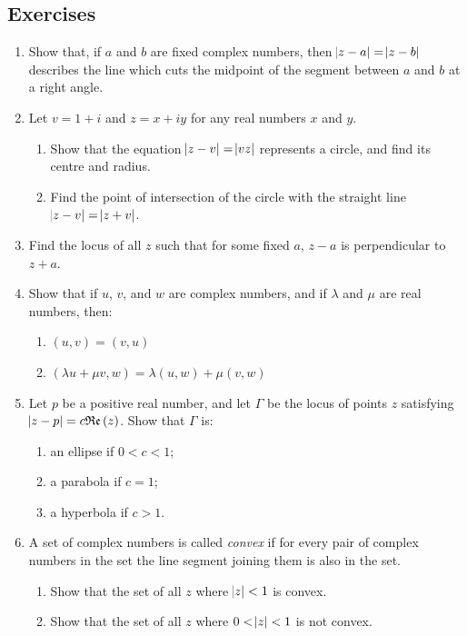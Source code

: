 \documentclass[a4paper,10pt,titlepage]{article}
\theoremstyle{definition}
\newcommand*\realp[1]{ \mathfrak{Re} \left ( {#1} \right )  }
\newcommand{\hard}{\refstepcounter{enumi}\item[$^\star$\theenumi.]}
\begin{document}
\subsection*{Exercises}
\begin{enumerate}
  \item Show that, if $ a $ and $ b $ are fixed complex numbers, then $ \abs{z - a} = \abs{z - b} $ describes the line which
        cuts the midpoint of the segment between $ a $ and $ b $ at a right angle.
  \hard Let $ v = 1 + i $ and $ z = x + iy $ for any real numbers $ x $ and $ y $.
    \begin{enumerate}
      \item Show that the equation $ \abs{z - v} = \abs{vz} $ represents a circle, and find its
            centre and radius.
      \item Find the point of intersection of the circle with the straight line $ \abs{z - v} = \abs{z + v} $.
    \end{enumerate}
  \item Find the locus of all $ z $ such that for some fixed $ a $, $ z - a $ is perpendicular to $ z + a $.
  \item Show that if $ u $, $ v $, and $ w $ are complex numbers, and if $ \lambda $ and $ \mu $ are real
        numbers, then:
    \begin{enumerate}
      \item $ (u, v) = (v, u) $
      \item $ (\lambda u + \mu v, w) = \lambda(u, w) + \mu(v, w) $
    \end{enumerate}
  \item Let $ p $ be a positive real number, and let $ \Gamma $ be the locus of points $ z $ satisfying $ \abs{z - p} = c\realp{z} $. Show
        that $ \Gamma $ is:
    \begin{enumerate}
      \item an ellipse if $ 0 < c < 1 $;
      \item a parabola if $ c = 1 $;
      \item a hyperbola if $ c > 1 $.
    \end{enumerate}
  \item A set of complex numbers is called \emph{convex} if for every pair of complex numbers in the set the line segment joining
        them is also in the set.
    \begin{enumerate}
      \item Show that the set of all $ z $ where $ \abs{z} < 1 $ is convex.
      \item Show that the set of all $ z $ where $ 0 < \abs{z} < 1 $ is not convex.

\end{enumerate}
\end{enumerate}
\end{document}
